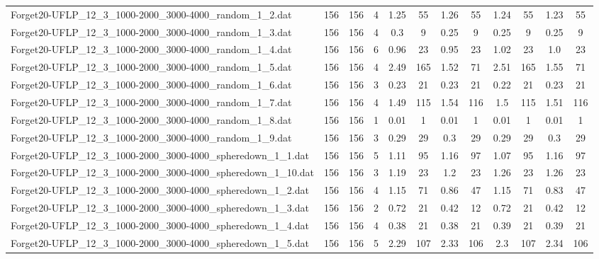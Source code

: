 \begin{sidewaystable}[!ht]
{\begin{tabular}{lccccccccccc}
Forget20-UFLP\_12\_3\_1000-2000\_3000-4000\_random\_1\_2.dat & 156 & 156 & 4 & 1.25 & 55 & 1.26 & 55 & 1.24 & 55 &  \textcolor{blue2}{1.23} & 55 \\
Forget20-UFLP\_12\_3\_1000-2000\_3000-4000\_random\_1\_3.dat & 156 & 156 & 4 & 0.3 & 9 &  \textcolor{blue2}{0.25} & 9 &  \textcolor{blue2}{0.25} & 9 &  \textcolor{blue2}{0.25} & 9 \\
Forget20-UFLP\_12\_3\_1000-2000\_3000-4000\_random\_1\_4.dat & 156 & 156 & 6 & 0.96 & 23 &  \textcolor{blue2}{0.95} & 23 & 1.02 & 23 & 1.0 & 23 \\
Forget20-UFLP\_12\_3\_1000-2000\_3000-4000\_random\_1\_5.dat & 156 & 156 & 4 & 2.49 & 165 &  \textcolor{blue2}{1.52} & 71 & 2.51 & 165 & 1.55 & 71 \\
Forget20-UFLP\_12\_3\_1000-2000\_3000-4000\_random\_1\_6.dat & 156 & 156 & 3 & 0.23 & 21 & 0.23 & 21 &  \textcolor{blue2}{0.22} & 21 & 0.23 & 21 \\
Forget20-UFLP\_12\_3\_1000-2000\_3000-4000\_random\_1\_7.dat & 156 & 156 & 4 &  \textcolor{blue2}{1.49} & 115 & 1.54 & 116 & 1.5 & 115 & 1.51 & 116 \\
Forget20-UFLP\_12\_3\_1000-2000\_3000-4000\_random\_1\_8.dat & 156 & 156 & 1 &  \textcolor{blue2}{0.01} & 1 &  \textcolor{blue2}{0.01} & 1 &  \textcolor{blue2}{0.01} & 1 &  \textcolor{blue2}{0.01} & 1 \\
Forget20-UFLP\_12\_3\_1000-2000\_3000-4000\_random\_1\_9.dat & 156 & 156 & 3 &  \textcolor{blue2}{0.29} & 29 & 0.3 & 29 &  \textcolor{blue2}{0.29} & 29 & 0.3 & 29 \\
Forget20-UFLP\_12\_3\_1000-2000\_3000-4000\_spheredown\_1\_1.dat & 156 & 156 & 5 & 1.11 & 95 & 1.16 & 97 &  \textcolor{blue2}{1.07} & 95 & 1.16 & 97 \\
Forget20-UFLP\_12\_3\_1000-2000\_3000-4000\_spheredown\_1\_10.dat & 156 & 156 & 3 & 1.19 & 23 & 1.2 & 23 & 1.26 & 23 & 1.26 & 23 \\
Forget20-UFLP\_12\_3\_1000-2000\_3000-4000\_spheredown\_1\_2.dat & 156 & 156 & 4 & 1.15 & 71 & 0.86 & 47 & 1.15 & 71 &  \textcolor{blue2}{0.83} & 47 \\
Forget20-UFLP\_12\_3\_1000-2000\_3000-4000\_spheredown\_1\_3.dat & 156 & 156 & 2 & 0.72 & 21 &  \textcolor{blue2}{0.42} & 12 & 0.72 & 21 &  \textcolor{blue2}{0.42} & 12 \\
Forget20-UFLP\_12\_3\_1000-2000\_3000-4000\_spheredown\_1\_4.dat & 156 & 156 & 4 &  \textcolor{blue2}{0.38} & 21 &  \textcolor{blue2}{0.38} & 21 & 0.39 & 21 & 0.39 & 21 \\
Forget20-UFLP\_12\_3\_1000-2000\_3000-4000\_spheredown\_1\_5.dat & 156 & 156 & 5 & 2.29 & 107 & 2.33 & 106 & 2.3 & 107 & 2.34 & 106 \\

\end{tabular}}
\end{sidewaystable}

